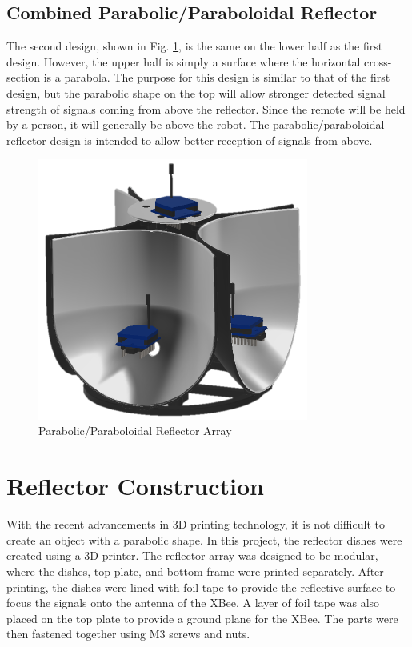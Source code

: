 \subsection{Combined Parabolic/Paraboloidal Reflector}
The second design, shown in Fig. \ref{fig:parabolicReflector}, is the same on the lower half as the first design. However, the upper half is simply a surface where the horizontal cross-section is a parabola. The purpose for this design is similar to that of the first design, but the parabolic shape on the top will allow stronger detected signal strength of signals coming from above the reflector. Since the remote will be held by a person, it will generally be above the robot. The parabolic/paraboloidal reflector design is intended to allow better reception of signals from above.
\begin{figure}
    \centering
    \includegraphics[width=3.5in]{figs/img/parabolicReflector.png}
    \caption{Parabolic/Paraboloidal Reflector Array}
    \label{fig:parabolicReflector}
\end{figure}

\section{Reflector Construction}
With the recent advancements in 3D printing technology, it is not difficult to create an object with a parabolic shape. In this project, the reflector dishes were created using a 3D printer. The reflector array was designed to be modular, where the dishes, top plate, and bottom frame were printed separately. After printing, the dishes were lined with foil tape to provide the reflective surface to focus the signals onto the antenna of the XBee. A layer of foil tape was also placed on the top plate to provide a ground plane for the XBee. The parts were then fastened together using M3 screws and nuts.


